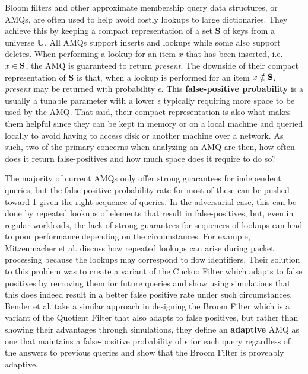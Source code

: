 \documentclass[../paper.tex]{subfiles}
\begin{document}
    Bloom filters and other approximate membership query data structures, or
    AMQs, are often used to help avoid costly lookups to large dictionaries.
    They achieve this by keeping a compact representation of a set
    {\bf S} of keys from a universe {\bf U}.  All AMQs support inserts and lookups
    while some also support deletes.  When performing a lookup for an item $x$
    that has been inserted, i.e. $x\in {\bf S}$, the AMQ is guaranteed to return
    {\it present}.  The downside of their compact representation of {\bf S} is
    that, when a lookup is performed for an item $x \notin {\bf S}$, {\it present}
    may be returned with probability $\epsilon$.  This {\bf false-positive
    probability} is a usually a tunable parameter with a lower $\epsilon$
    typically requiring more space to be used by the AMQ.  That said, their
    compact representation is also what makes them helpful since they can be
    kept in memory or on a local machine and queried locally to avoid having to
    access disk or another machine over a network.  As such, two of the primary
    concerns when analyzing an AMQ are then, how often does it return
    false-positives and how much space does it require to do so?

    The majority of current AMQs only offer strong guarantees for independent
    queries, but the false-positive probability rate for most of these can be
    pushed toward 1 given the right sequence of queries.  In the adversarial
    case, this can be done by repeated lookups of elements that result in
    false-positives, but, even in regular workloads, the lack of strong
    guarantees for sequences of lookups can lead to poor performance depending
    on the circumstances.  For example, Mitzenmacher et al.
    \cite{adaptive-cuckoo} discuss how repeated lookups can arise during packet
    processing because the lookups may correspond to flow identifiers.  Their
    solution to this problem was to create a variant of the Cuckoo Filter
    \cite{cuckoo-filter} which adapts to false positives by removing them for
    future queries and show using simulations that this does indeed result in a
    better false positive rate under such circumstances.  Bender et al.
    \cite{broom-filter} take a similar approach in designing the Broom Filter
    which is a variant of the Quotient Filter \cite{quotient-filter} that also
    adapts to false positives, but rather than showing their advantages through
    simulations, they define an {\bf adaptive} AMQ as one that maintains a
    false-positive probability of $\epsilon$ for each query regardless of the
    answers to previous queries and show that the Broom Filter is proveably
    adaptive.
\end{document}
